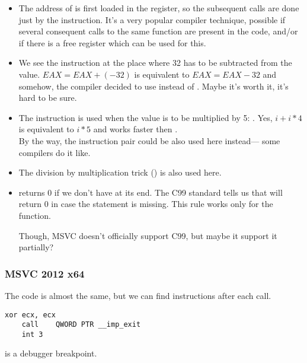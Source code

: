 \begin{itemize}
\item The address of \printf is first loaded in the 
\ESI register, so the subsequent
\printf calls are done just by the  instruction.
It's a very popular compiler 
technique, possible if several consequent calls to the same function are present
in the code, and/or if there is a free register which can be used for this.

\item We see the  
instruction at the place where 32 has to be subtracted from the value.
$EAX=EAX+(-32)$ is equivalent to $EAX=EAX-32$ 
and somehow, the compiler decided to use  instead of .
Maybe it's worth it, it's hard to be sure.

\item The \LEA instruction is used when 
the value is to be multiplied by 5: .
Yes, $i+i*4$ is equivalent to $i*5$ and \LEA 
works faster then .\\
By the way, the  instruction pair could be also used here instead---
some compilers do it like.

\item The division by multiplication trick () 
is also used here.

\item \main returns 0 if we don't have  
at its end.
The C99 standard tells us  that \main 
will return 0 in case the 
 statement is missing.
This rule works only for the \main function.

Though, MSVC doesn't officially support C99, but maybe it support it partially?
\end{itemize}

\subsubsection{\Optimizing MSVC 2012 x64}

The code is almost the same, but we can find  instructions after each  call.

\begin{lstlisting}[style=customasm]
	xor	ecx, ecx
	call	QWORD PTR __imp_exit
	int	3
\end{lstlisting}

 is a debugger breakpoint.

